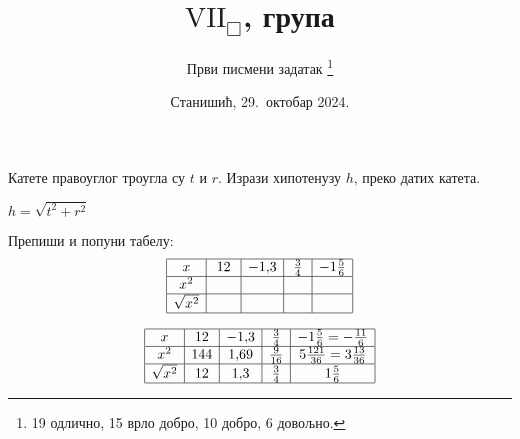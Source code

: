 \documentclass[12pt,a5paper,addpoints]{exam}
\title{$\mathrm{VII}_\Box$, група \grupa 1234}
\author{Први писмени задатак
 \thanks{
  19 одлично,
  15 врло добро,
  10 добро,
   6 довољно.
 }
}
\date{Станишић, 29.\ октобар 2024.}
\def\grupa#1#2#3#4{#1}
\begin{document}
\maketitle
\thispagestyle{headandfoot}

\noindent \gradetable[h]

\begin{questions}

\question[1] %
 Катете правоуглог троугла су $\grupa tshv$ и $\grupa rdts$.
 Изрази хипотенузу $\grupa hvrd$, преко датих катета.
 \begin{solution}
  $
   \grupa
    {h = \sqrt{t^2 + r^2}}
    {v = \sqrt{s^2 + d^2}}
    {r = \sqrt{h^2 + t^2}}
    {d = \sqrt{v^2 + s^2}}
  $
 \end{solution}

\question[4] %
 Препиши и попуни табелу:
 $$
  \begin{array}{|*5{c|}} \hline
   x & \grupa
    {12 & -1,\!3 & \frac 34 & -1 \frac 56}
    {11 & -1,\!4 & \frac 35 & -2 \frac 23}
    {14 & -1,\!1 & \frac 56 & -1 \frac 34}
    {13 & -1,\!2 & \frac 25 & -3 \frac 12}
   \\\hline
   x^2 & \phantom{121} & \phantom{1,\!44} & \phantom{\frac 4{25}} & \phantom{5 \frac 49} \\\hline
   \sqrt{x^2} & & & & \\\hline
  \end{array}
 $$
 \begin{solution}
 $$
  \begin{array}{|*5{c|}} \hline
   x & \grupa
    {12 & -1,\!3 & \frac 34 & -1 \frac 56 = - \frac{11}6}
    {11 & -1,\!4 & \frac 35 & -2 \frac 23 = - \frac 83}
    {14 & -1,\!1 & \frac 56 & -1 \frac 34 = - \frac 74}
    {13 & -1,\!2 & \frac 25 & -3 \frac 12 = - \frac 72}
   \\\hline
   x^2 & \grupa
    {144 & 1,\!69 & \frac 9{16} & 5 \frac{121}{36} = 3 \frac{13}{36}}
    {121 & 1,\!96 & \frac 9{25} & 5 \frac{64}9 = 7 \frac 19}
    {196 & 1,\!21 & \frac{25}{36} & 5 \frac{49}{16} = 3 \frac 1{16}}
    {169 & 1,\!44 & \frac 4{25} & 5 \frac{49}4 = 12 \frac 14}
   \\\hline
   \sqrt{x^2} & \grupa
    {12 & 1,\!3 & \frac 34 & 1 \frac 56}
    {11 & 1,\!4 & \frac 35 & 2 \frac 23}
    {14 & 1,\!1 & \frac 56 & 1 \frac 34}
    {13 & 1,\!2 & \frac 25 & 3 \frac 12}
   \\\hline
  \end{array}
 $$
 \end{solution}


\end{questions}
\end{document}
